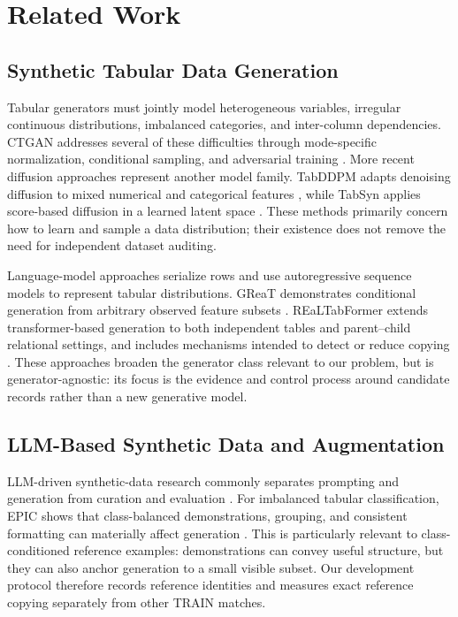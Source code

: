 \section{Related Work}
\label{sec:related-work}

\subsection{Synthetic Tabular Data Generation}

Tabular generators must jointly model heterogeneous variables, irregular
continuous distributions, imbalanced categories, and inter-column
dependencies. CTGAN addresses several of these difficulties through
mode-specific normalization, conditional sampling, and adversarial training
\citep{xu2019ctgan}. More recent diffusion approaches represent another model
family. TabDDPM adapts denoising diffusion to mixed numerical and categorical
features \citep{kotelnikov2023tabddpm}, while TabSyn applies score-based
diffusion in a learned latent space \citep{zhang2024tabsyn}. These methods
primarily concern how to learn and sample a data distribution; their existence
does not remove the need for independent dataset auditing.

Language-model approaches serialize rows and use autoregressive sequence
models to represent tabular distributions. GReaT demonstrates conditional
generation from arbitrary observed feature subsets
\citep{borisov2023great}. REaLTabFormer extends transformer-based generation
to both independent tables and parent--child relational settings, and includes
mechanisms intended to detect or reduce copying
\citep{solatorio2023realtabformer}. These approaches broaden the generator
class relevant to our problem, but \rcqasyn{} is generator-agnostic: its focus
is the evidence and control process around candidate records rather than a new
generative model.

\subsection{LLM-Based Synthetic Data and Augmentation}

LLM-driven synthetic-data research commonly separates prompting and
generation from curation and evaluation \citep{long2024survey}. For imbalanced
tabular classification, EPIC shows that class-balanced demonstrations,
grouping, and consistent formatting can materially affect generation
\citep{kim2024epic}. This is particularly relevant to class-conditioned
reference examples: demonstrations can convey useful structure, but they can
also anchor generation to a small visible subset. Our development protocol
therefore records reference identities and measures exact reference copying
separately from other TRAIN matches.

